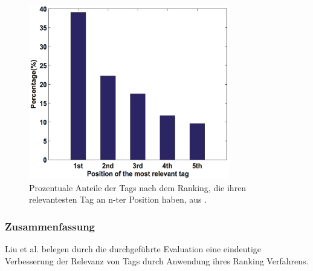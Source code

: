 \begin{figure}[htbp]
  \centering
    \includegraphics[height=3in]{images/positionRelevantTags.png}
  \caption{Prozentuale Anteile der Tags nach dem Ranking, die ihren relevantesten Tag an n-ter Position haben, aus \cite{ranking}.}
  \label{fig:images_positionRelevantTags}
\end{figure}



\subsubsection*{Zusammenfassung} %
\label{ssub:zusammenfassung_und_bewertung_liu}
Liu et al. belegen durch die durchgeführte Evaluation eine eindeutige Verbesserung der Relevanz von Tags durch Anwendung ihres Ranking Verfahrens. 



